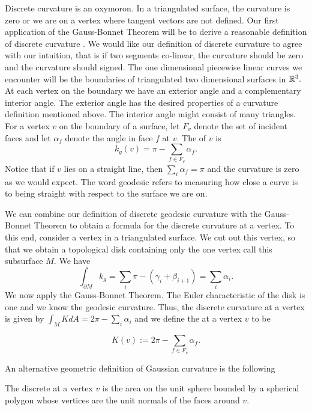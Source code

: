 Discrete curvature is an oxymoron. In a triangulated surface,
the curvature is zero or we are on a vertex where tangent vectors are not defined.
Our first application of the Gauss-Bonnet Theorem will be to derive a reasonable definition of discrete curvature \cite{Crane:2013}.
We would like our definition of discrete curvature to agree with
our intuition, that is if two segments co-linear, the curvature should be zero
and the curvature should signed.
The one dimensional piecewise linear curves we encounter will be the boundaries
of triangulated two dimensional surfaces in $\mathbb{R}^3.$
At each vertex on the boundary we have an exterior angle and a complementary interior angle.
The exterior angle has the desired properties of a curvature definition mentioned above.
The interior angle might consist of many triangles.
For a vertex $v$ on the boundary of a surface, 
let $F_v$  denote the set of incident faces and let
$\alpha_f$ denote the angle in face $f$ at $v$.
The 
of $v$  is
$$k_{g}(v)= \pi-\sum_{f\in F_v}\alpha_f.$$
Notice that if $v$ lies on a straight line, then $\sum_{i}\alpha_f=\pi$
and the curvature is zero as we would expect.
The word geodesic refers to measuring how close
a curve is to being straight with respect to the surface we are on.

We can combine our definition of discrete geodesic curvature
with the Gauss-Bonnet Theorem to obtain a formula for the discrete
curvature at a vertex.
To this end, consider a vertex in a triangulated surface.
We cut out this vertex, so that we obtain a topological disk containing
only the one vertex call this subsurface $M$. We have
$$\int_{\partial M}k_g=\sum_i\pi -(\gamma_i+\beta_{i+1})=\sum_i\alpha_i.$$
We now apply the Gauss-Bonnet Theorem.
The Euler characteristic of the disk is one and we know the geodesic curvature.
Thus, the discrete curvature at a vertex is given by
$\int_M K dA=2\pi-\sum_i\alpha_i$ and we define
the  at a vertex $v$ to be

\begin{equation} \label{eqn:discrete-gaussian}
K(v):=2\pi -\sum_{f\in F_v}\alpha_f.
\end{equation}

An alternative geometric definition of Gaussian curvature is the following

\begin{definition}\label{def:discrete-curvature-vertex}

The discrete  at a vertex $v$ is the area on the unit 
sphere bounded by a spherical polygon whose vertices are the unit normals of 
the faces around $v$.

\end{definition}

